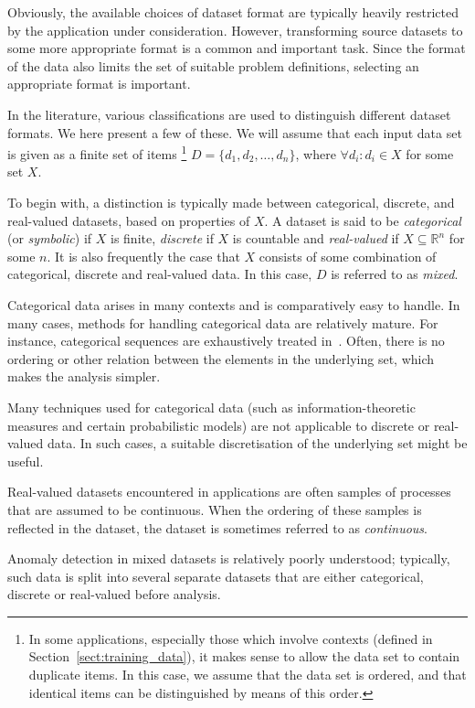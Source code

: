 Obviously, the available choices of dataset format are typically heavily restricted by the application under consideration. However, transforming source datasets to some more appropriate format is a common and important task. Since the format of the data also limits the set of suitable problem definitions, selecting an appropriate format is important.

In the literature, various classifications are used to distinguish different dataset formats. We here present a few of these. We will assume that each input data set is given as a finite set of items \footnote{In some applications, especially those which involve contexts (defined in Section~\ref{sect:training_data}), it makes sense to allow the data set to contain duplicate items. In this case, we assume that the data set is ordered, and that identical items can be distinguished by means of this order.} $D = \{d_1, d_2, \dots, d_n\}$, where $\forall d_i: d_i \in X$ for some set $X$.

To begin with, a distinction is typically made between categorical, discrete, and real-valued datasets, based on properties of $X$. A dataset is said to be \emph{categorical} (or \emph{symbolic}) if $X$ is finite, \emph{discrete} if $X$ is countable and \emph{real-valued} if $X \subseteq \mathbb{R}^n$ for some $n$. It is also frequently the case that $X$ consists of some combination of categorical, discrete and real-valued data. In this case, $D$ is referred to as \emph{mixed}.

Categorical data arises in many contexts and is comparatively easy to handle. In many cases, methods for handling categorical data are relatively mature. For instance, categorical sequences are exhaustively treated in~\cite{TODO}. Often, there is no ordering or other relation between the elements in the underlying set, which makes the analysis simpler.

Many techniques used for categorical data (such as information-theoretic measures and certain probabilistic models) are not applicable to discrete or real-valued data. In such cases, a suitable discretisation of the underlying set might be useful.

Real-valued datasets encountered in applications are often samples of processes that are assumed to be continuous. When the ordering of these samples is reflected in the dataset, the dataset is sometimes referred to as \emph{continuous}.

Anomaly detection in mixed datasets is relatively poorly understood; typically, such data is split into several separate datasets that are either categorical, discrete or real-valued before analysis.

